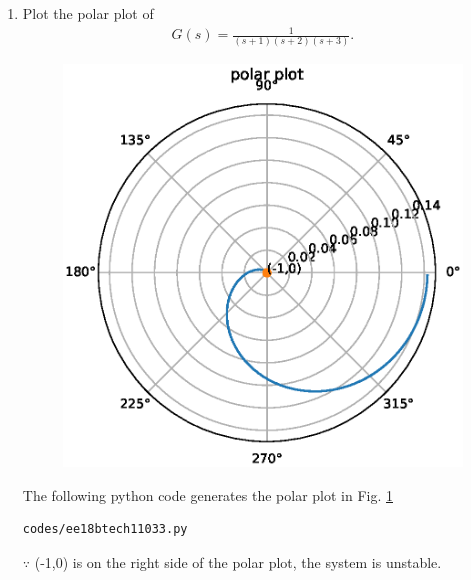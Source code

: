 \begin{enumerate}[label=\thesubsection.\arabic*.,ref=\thesubsection.\theenumi]
\item Plot the polar plot of 
\begin{align}
G(s) = \frac{1}{(s+1)(s+2)(s+3)}. 
\end{align}

\solution


\begin{figure}[!ht]
\centering
  \includegraphics[width=\columnwidth]{./figs/ee18btech11033.eps}
\caption{}
  \label{fig:ee18btech11033}
  \label{fig:ee18btech11033}
\end{figure}

The following python code generates the polar plot in Fig.   \ref{fig:ee18btech11033}

\begin{lstlisting}
codes/ee18btech11033.py
\end{lstlisting}
$\because$  (-1,0) is on the right side of the polar plot, the system is unstable.

\end{enumerate}
